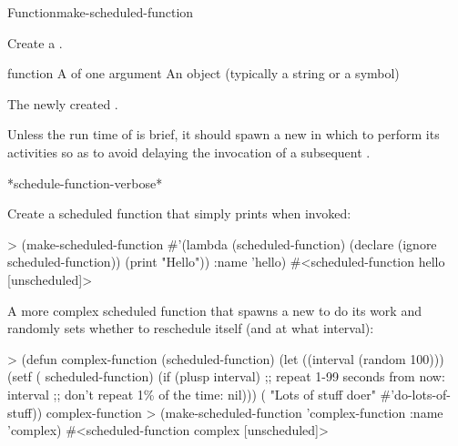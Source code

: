 \documentclass[10pt,twoside,english,pdftex]{article}
\begin{document}

\begin{functiondoc}{Function}{make-scheduled-function}{ 
     
    \returns{} } 
%
%
%
%

\fnsyntax

\fnpurpose Create a .

\fnpackage {}

\fnmodule {}

\fnargs
\begin{args}{function}
\arg[function] A  of one argument
\arg[name] An object (typically a string or a symbol)
\end{args}

\fnreturns The newly created . 

\fnerrors
\nothreads{}

\fndescription Unless the run time of  is brief, it
should spawn a new  in which to perform its activities
so as to avoid delaying the invocation of a subsequent
.

\begin{alsos}{*schedule-function-verbose*}
\end{alsos}

\fnexamples
Create a scheduled function that simply prints  when invoked:
\begin{example}
> (make-scheduled-function 
    #'(lambda (scheduled-function)
        (declare (ignore scheduled-function))
        (print "Hello"))
    :name 'hello)
#<scheduled-function hello [unscheduled]>
\end{example}

%
%
A more complex scheduled function that spawns a new  to do its
work and randomly sets whether to reschedule itself (and at what interval):
\begin{example}
> (defun complex-function (scheduled-function)
    (let ((interval (random 100)))
      (setf ( scheduled-function)
            (if (plusp interval) 
                ;; repeat 1-99 seconds from now:
                interval
                ;; don't repeat 1\% of the time:
                nil)))
    ( "Lots of stuff doer" #'do-lots-of-stuff))
complex-function
> (make-scheduled-function 'complex-function :name 'complex)
#<scheduled-function complex [unscheduled]>
\end{example}

\end{functiondoc}
\end{document}
